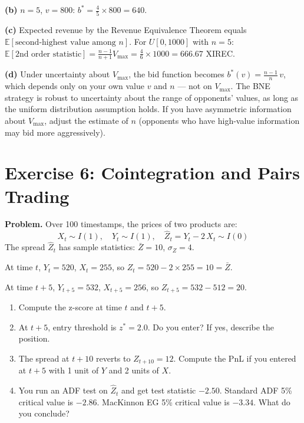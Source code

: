 \documentclass[12pt,a4paper,openany]{report}
\theoremstyle{definition}
\begin{document}
\textbf{(b)} $n = 5$, $v = 800$: $b^* = \frac{4}{5} \times 800 = 640$.

\textbf{(c)} Expected revenue by the Revenue Equivalence Theorem equals $\mathbb{E}[\text{second-highest value among }n]$. For $U[0,1000]$ with $n=5$: $\mathbb{E}[\text{2nd order statistic}] = \frac{n-1}{n+1}V_{\max} = \frac{4}{6} \times 1000 = 666.67$ XIREC.

\textbf{(d)} Under uncertainty about $V_{\max}$, the bid function becomes $b^*(v) = \frac{n-1}{n}\,v$, which depends only on your own value $v$ and $n$ — not on $V_{\max}$. The BNE strategy is robust to uncertainty about the range of opponents' values, as long as the uniform distribution assumption holds. If you have asymmetric information about $V_{\max}$, adjust the estimate of $n$ (opponents who have high-value information may bid more aggressively).

\section*{Exercise 6: Cointegration and Pairs Trading}

\textbf{Problem.} Over 100 timestamps, the prices of two products are:
\[
  X_t \sim I(1), \quad Y_t \sim I(1), \quad \hat{Z}_t = Y_t - 2\,X_t \sim I(0)
\]
The spread $\hat{Z}_t$ has sample statistics: $\bar{Z} = 10$, $\sigma_Z = 4$.

At time $t$, $Y_t = 520$, $X_t = 255$, so $Z_t = 520 - 2 \times 255 = 10 = \bar{Z}$.
\vspace{3pt}

At time $t+5$, $Y_{t+5} = 532$, $X_{t+5} = 256$, so $Z_{t+5} = 532 - 512 = 20$.

\begin{enumerate}[label=(\alph*)]
  \item Compute the z-score at time $t$ and $t+5$.
  \item At $t+5$, entry threshold is $z^* = 2.0$. Do you enter? If yes, describe the position.
  \item The spread at $t+10$ reverts to $Z_{t+10} = 12$. Compute the PnL if you entered at $t+5$ with 1 unit of $Y$ and 2 units of $X$.
  \item You run an ADF test on $\hat{Z}_t$ and get test statistic $-2.50$. Standard ADF 5\% critical value is $-2.86$. MacKinnon EG 5\% critical value is $-3.34$. What do you conclude?
\end{enumerate}
\end{document}
